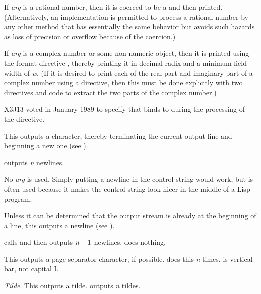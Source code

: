 \begin{flushdesc}
If \emph{arg} is a rational number, then it is coerced to be a 
and then printed.  (Alternatively, an implementation is permitted to
process a rational number by any other method that has essentially the
same behavior but avoids such hazards as loss of precision or overflow
because of the coercion.)

If \emph{arg} is a complex number or some non-numeric
object, then it is printed using the format directive ,
thereby printing it in decimal radix and a minimum field width of \emph{w}.
(If it is desired to print each of the real part and imaginary part
of a complex number using a \cd{{\Xtilde}\$} directive, then this must
be done explicitly with two \cd{{\Xtilde}\$} directives and code to
extract the two parts of the complex number.)

\begin{new}
X3J13 voted in January 1989
to specify that  binds  to 
during the processing of the \cd{{\Xtilde}\$} directive.
\end{new}


\item[\cd{{\Xtilde}\%}]
This outputs a  character, thereby terminating the current
output line and beginning a new one
(see ).

 outputs \emph{n} newlines.

No \emph{arg} is used.  Simply putting a newline in the control string
would work, but \cd{{\Xtilde}\%} is often used because it makes the control string
look nicer in the middle of a Lisp program.

\item[\cd{{\Xtilde}\&}]
Unless it can be determined that the output stream
is already at the beginning of a line,
this outputs a newline (see ).

 calls 
and then outputs $\emph{n}-1$ newlines.
 does nothing.

\item[\cd{{\Xtilde}|}]
This outputs a page separator character, if possible.
 does this
\emph{n} times.  \cd{|} is vertical bar, not capital I.

\item[\cd{{\Xtilde}{\Xtilde}}]
\emph{Tilde}.
This outputs a tilde.   outputs \emph{n} tildes.


\end{flushdesc}
